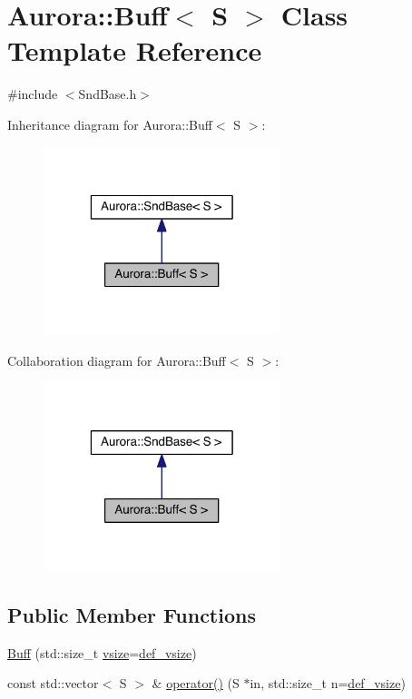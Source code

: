 \hypertarget{class_aurora_1_1_buff}{}\section{Aurora\+:\+:Buff$<$ S $>$ Class Template Reference}
\label{class_aurora_1_1_buff}


{\ttfamily \#include $<$Snd\+Base.\+h$>$}



Inheritance diagram for Aurora\+:\+:Buff$<$ S $>$\+:\nopagebreak
\begin{figure}[H]
\begin{center}
\leavevmode
\includegraphics[width=196pt]{class_aurora_1_1_buff__inherit__graph}
\end{center}
\end{figure}


Collaboration diagram for Aurora\+:\+:Buff$<$ S $>$\+:\nopagebreak
\begin{figure}[H]
\begin{center}
\leavevmode
\includegraphics[width=196pt]{class_aurora_1_1_buff__coll__graph}
\end{center}
\end{figure}
\subsection*{Public Member Functions}
\begin{DoxyCompactItemize}
\item 
\hyperlink{class_aurora_1_1_buff_aa6a1980c02f6f9e416bbc59905e847ad}{Buff} (std\+::size\+\_\+t \hyperlink{class_aurora_1_1_snd_base_af9e21aaf411b17f7a8221c991ce5d291}{vsize}=\hyperlink{namespace_aurora_afaaddf667a06e7ce23c667a8b7295263}{def\+\_\+vsize})
\item 
const std\+::vector$<$ S $>$ \& \hyperlink{class_aurora_1_1_buff_a2f0e8c8310f776585144d0c1567d3e5a}{operator()} (S $\ast$in, std\+::size\+\_\+t n=\hyperlink{namespace_aurora_afaaddf667a06e7ce23c667a8b7295263}{def\+\_\+vsize})
\end{DoxyCompactItemize}
